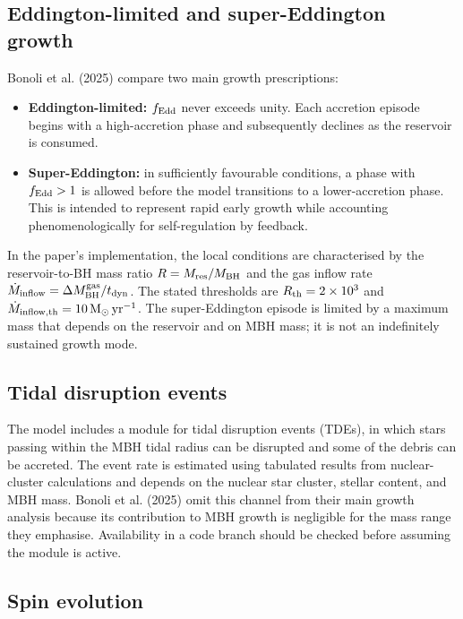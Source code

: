 \documentclass[11pt,a4paper]{article}
\newcommand{\Msun}{\mathrm{M}_{\odot}}
\begin{document}
\subsection{Eddington-limited and super-Eddington growth}

Bonoli et al. (2025) compare two main growth prescriptions:
\begin{itemize}
  \item \textbf{Eddington-limited:} $f_{\rm Edd}$ never exceeds unity. Each accretion episode begins with a high-accretion phase and subsequently declines as the reservoir is consumed.
  \item \textbf{Super-Eddington:} in sufficiently favourable conditions, a phase with $f_{\rm Edd}>1$ is allowed before the model transitions to a lower-accretion phase. This is intended to represent rapid early growth while accounting phenomenologically for self-regulation by feedback.
\end{itemize}

In the paper's implementation, the local conditions are characterised by the reservoir-to-BH mass ratio $R=M_{\rm res}/M_{\rm BH}$ and the gas inflow rate $\dot M_{\rm inflow}=\Delta M_{\rm BH}^{\rm gas}/t_{\rm dyn}$. The stated thresholds are $R_{\rm th}=2\times10^3$ and $\dot M_{\rm inflow,th}=10\,\Msun\,\mathrm{yr}^{-1}$. The super-Eddington episode is limited by a maximum mass that depends on the reservoir and on MBH mass; it is not an indefinitely sustained growth mode.

\subsection{Tidal disruption events}

The model includes a module for tidal disruption events (TDEs), in which stars passing within the MBH tidal radius can be disrupted and some of the debris can be accreted. The event rate is estimated using tabulated results from nuclear-cluster calculations and depends on the nuclear star cluster, stellar content, and MBH mass. Bonoli et al. (2025) omit this channel from their main growth analysis because its contribution to MBH growth is negligible for the mass range they emphasise. Availability in a code branch should be checked before assuming the module is active.

\subsection{Spin evolution}
\end{document}
